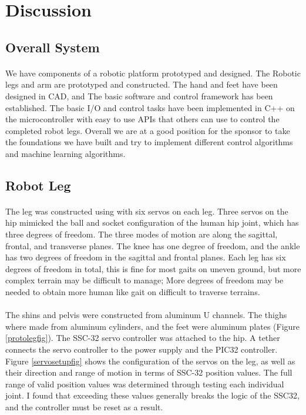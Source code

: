 \documentclass[titlepage,letterpaper,12pt]{article}
\begin{document}
\section{Discussion}
\subsection{Overall System}
\paragraph{}We have components of a robotic platform prototyped and
designed. The Robotic legs and arm are prototyped and constructed. The hand and
feet have been designed in CAD, and The basic software and control framework has
been established. The basic I/O and control tasks have been implemented in C++
on the microcontroller with easy to use APIs that others can use to control the
completed robot legs. Overall we are at a good position for the
sponsor to take the foundations we have built and try to implement different
control algorithms and machine learning algorithms. 

\subsection{Robot Leg}
\paragraph{}The leg was constructed using with six servos on each leg. Three
servos on the hip mimicked the ball and socket configuration of the human hip
joint, which has three degrees of freedom\cite{SiasJr1990}. The three modes of
motion are along the sagittal, frontal, and transverse planes\cite{Fiscell2005}.
The knee has one degree of freedom, and the ankle has two degrees of freedom in
the sagittal and frontal planes. Each leg has six degrees of freedom in total,
this is fine for most gaits on uneven ground, but more complex terrain may be 
difficult to manage; More degrees of freedom may be needed to obtain more human
like gait on difficult to traverse terrains\cite{SiasJr1990}.

\paragraph{}The shins and pelvis were constructed from aluminum U channels. The
thighs where made from aluminum cylinders, and the feet were aluminum plates
(Figure \ref{protolegfig}). The SSC-32 servo controller was attached to the hip.
A tether connects the servo controller to the power supply and the PIC32
controller. Figure \ref{servosetupfig} shows the configuration of the servos on
the leg, as well as their direction and range of motion in terms of SSC-32
position values. The full range of valid position values was determined through
testing each individual joint. I found that exceeding these values generally
breaks the logic of the SSC32, and the controller must be reset as a result. 
\end{document}
